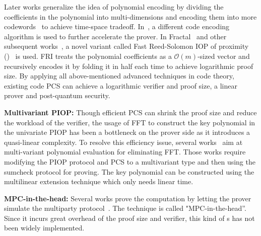 \documentclass[letterpaper,twocolumn,10pt]{article}
\theoremstyle{definition}
\newcommand{\mypara}[1]{\noindent\textbf{{#1: }}}
\newcommand{\zk}{\text{zk-SNARK}\xspace}
\newcommand{\new}[1]{{#1}\xspace}
\begin{document}
\new{Later works generalize the idea of polynomial encoding by dividing the coefficients in the polynomial into multi-dimensions and encoding them into more codewords~\cite{bootle2020linear,bootle2018efficient} to achieve time-space tradeoff. In~\cite{golovnev2023brakedown}, a different code encoding algorithm is used to further accelerate the prover. 
	In Fractal~\cite{chiesa2020fractal} and other subsequent works~\cite{ben2019aurora,szepieniec2022polynomial}, a novel variant called Fast Reed-Solomon IOP of proximity (\text{FRI})~\cite{ben2018fast} is used. FRI treats the polynomial coefficients as a $\mathcal{O}(m)$-sized vector and recursively encodes it by folding it in half each time to achieve logarithmic proof size. By applying all above-mentioned advanced techniques in code theory, existing code PCS can achieve a logarithmic verifier and proof size, a linear prover and post-quantum security}. 

\mypara{Multivariant PIOP} Though efficient PCS can shrink the proof size and reduce the workload of the verifier, the usage of FFT to construct the key polynomial in the univariate PIOP has been a bottleneck on the prover side as it introduces a quasi-linear complexity. To resolve this efficiency issue, several works~\cite{ chen2023hyperplonk,setty2020spartan,xie2019libra,libert2024simulation,xie2022orion,golovnev2023brakedown} aim at multi-variant polynomial evaluation for eliminating FFT. Those works require modifying the PIOP protocol and PCS to a multivariant type and then using the sumcheck protocol for proving. The key polynomial can be constructed using the multilinear extension technique which only needs linear time.

\mypara{MPC-in-the-head} Several works prove the computation by letting the prover simulate the multiparty protocol~\cite{giacomelli2016zkboo,chase2017post,katz2018improved,ghosal2022efficient,baum2020concretely}.
The technique is called "MPC-in-the-head''. Since it incurs great overhead of the proof size and verifier, this kind of {\zk}s has not been widely implemented.
\end{document}
